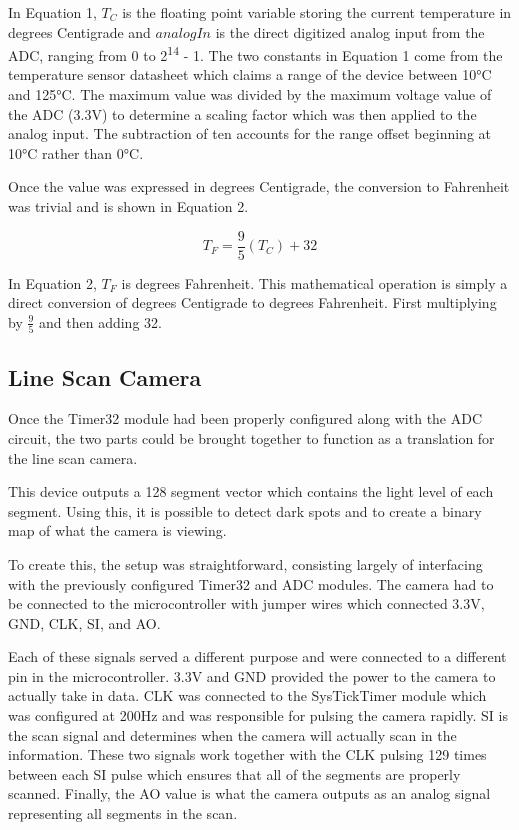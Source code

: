 \documentclass[conference]{IEEEtran}
\begin{document}
In Equation 1, $T_C$ is the floating point variable storing the current
temperature in degrees Centigrade and $analogIn$ is the direct digitized analog
input from the ADC, ranging from 0 to 2\textsuperscript{14} - 1.
The two constants in Equation 1 come from the
temperature sensor datasheet which claims a range of the device between
10°C and 125°C. The maximum value was divided by the maximum voltage value of
the ADC (3.3V) to determine a scaling factor which was then applied to the
analog input. The subtraction of ten accounts for the range offset beginning
at 10°C rather than 0°C.

Once the value was expressed in degrees Centigrade, the conversion to
Fahrenheit was trivial and is shown in Equation 2.

\begin{equation}
    T_F = \frac{9}{5}(T_C) + 32
\end{equation}

In Equation 2, $T_F$ is degrees Fahrenheit. This mathematical operation is
simply a direct conversion of degrees Centigrade to degrees Fahrenheit. First
multiplying by $\frac{9}{5}$ and then adding 32.


\subsection{Line Scan Camera}
Once the Timer32 module had been properly configured along with the ADC
circuit, the two parts could be brought together to function as a
translation for the line scan camera.

This device outputs a 128 segment vector which contains the light level of
each segment. Using this, it is possible to detect dark spots and to create a
binary map of what the camera is viewing.

To create this, the setup was straightforward, consisting largely of
interfacing with the previously configured Timer32 and ADC modules. The
camera had to be connected to the microcontroller with jumper wires which connected
3.3V, GND, CLK, SI, and AO.

Each of these signals served a different purpose and were connected to a different
pin in the microcontroller. 3.3V and GND provided the power to the camera
to actually take in data. CLK was connected to the SysTickTimer module which
was configured at 200Hz and was responsible for pulsing the camera rapidly. SI
is the scan signal and determines when the camera will actually scan in the
information. These two signals work together with the CLK pulsing 129 times
between each SI pulse which ensures that all of the segments are properly
scanned. Finally, the AO value is what the camera outputs as an analog signal
representing all segments in the scan.
\end{document}
